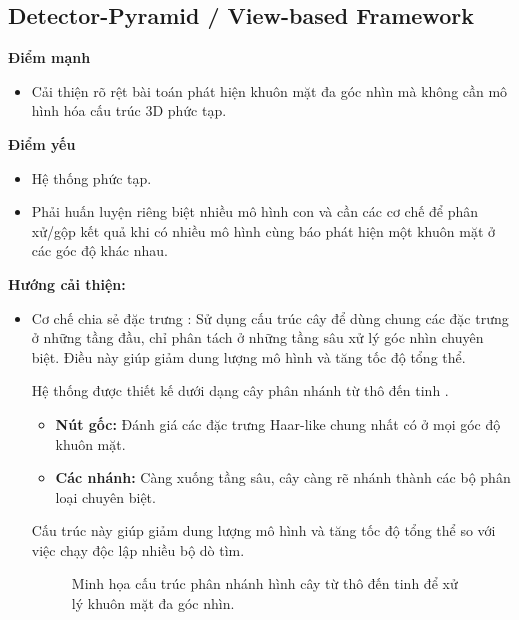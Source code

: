 \subsection{Detector-Pyramid / View-based Framework}
\textbf{Điểm mạnh}
\begin{itemize}
    \item Cải thiện rõ rệt bài toán phát hiện khuôn mặt đa góc nhìn mà không cần mô hình hóa cấu trúc 3D phức tạp.
\end{itemize}
\textbf{Điểm yếu}
\begin{itemize}
    \item Hệ thống phức tạp.
    \item Phải huấn luyện riêng biệt nhiều mô hình con và cần các cơ chế để phân xử/gộp kết quả khi có nhiều mô hình cùng báo phát hiện một khuôn mặt ở các góc độ khác nhau.
\end{itemize}
\textbf{Hướng cải thiện:}
\begin{itemize}
  \item Cơ chế chia sẻ đặc trưng \cite{torralba2007sharing}: Sử dụng cấu trúc cây để dùng chung các đặc trưng ở những tầng đầu, chỉ phân tách ở những tầng sâu xử lý góc nhìn chuyên biệt. Điều này giúp giảm dung lượng mô hình và tăng tốc độ tổng thể.

  Hệ thống được thiết kế dưới dạng cây phân nhánh từ thô đến tinh \cite{torralba2007sharing}. 
    \begin{itemize}
        \item \textbf{Nút gốc:} Đánh giá các đặc trưng Haar-like chung nhất có ở mọi góc độ khuôn mặt.
        \item \textbf{Các nhánh:} Càng xuống tầng sâu, cây càng rẽ nhánh thành các bộ phân loại chuyên biệt.
    \end{itemize}
    Cấu trúc này giúp giảm dung lượng mô hình và tăng tốc độ tổng thể so với việc chạy độc lập nhiều bộ dò tìm.
    \begin{figure}[h!]
      \centering
      \caption{Minh họa cấu trúc phân nhánh hình cây từ thô đến tinh để xử lý khuôn mặt đa góc nhìn.}
      \label{fig:tree_structure}
  \end{figure}

\end{itemize}


